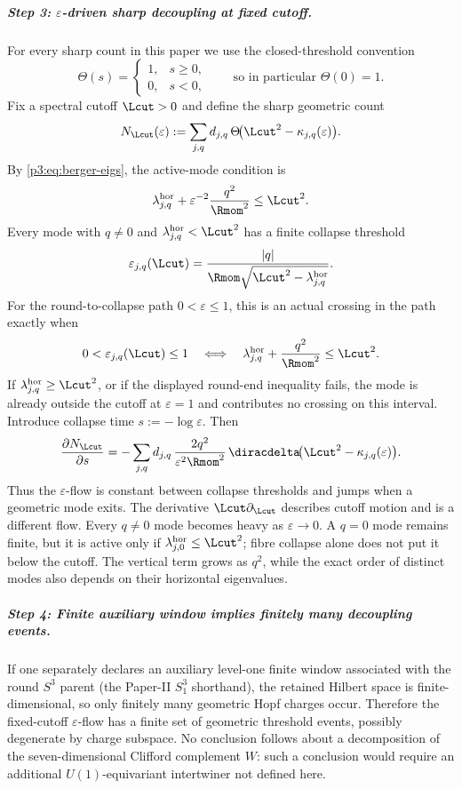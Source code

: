 \documentclass[11pt,a4paper]{article}
\begin{document}
\subparagraph{\texorpdfstring{Step 3: \(\varepsilon\)-driven sharp decoupling at fixed cutoff.}{Step 3: epsilon-driven sharp decoupling at fixed cutoff.}}
For every sharp count in this paper we use the closed-threshold convention
\[
 \Theta(s)=
 \begin{cases}
  1,&s\ge0,\\
  0,&s<0,
 \end{cases}
 \qquad\text{so in particular }\Theta(0)=1.
\]
Fix a spectral cutoff \(\Lcut>0\) and define the sharp geometric count
\[
 N_{\Lcut}(\varepsilon)
 :=\sum_{j,q}d_{j,q}\,
 \Theta\!\bigl(\Lcut^2-\kappa_{j,q}(\varepsilon)\bigr).
\]
By \eqref{p3:eq:berger-eigs}, the active-mode condition is
\[
\lambda^{\mathrm{hor}}_{j,q} + \varepsilon^{-2}\frac{q^2}{\Rmom^2} \le \Lcut^2.
\]
Every mode with \(q\ne0\) and
\(\lambda^{\rm hor}_{j,q}<\Lcut^2\) has a finite collapse threshold
\[
 \varepsilon_{j,q}(\Lcut)
 =\frac{|q|}
 {\Rmom\sqrt{\Lcut^2-\lambda^{\rm hor}_{j,q}}}.
\]
For the round-to-collapse path \(0<\varepsilon\le1\), this is an actual
crossing in the path exactly when
\[
 0<\varepsilon_{j,q}(\Lcut)\le1
 \quad\Longleftrightarrow\quad
 \lambda^{\rm hor}_{j,q}+\frac{q^2}{\Rmom^2}
 \le\Lcut^2 .
\]
If \(\lambda^{\rm hor}_{j,q}\ge\Lcut^2\), or if the displayed round-end
inequality fails, the mode is already outside the cutoff at
\(\varepsilon=1\) and contributes no crossing on this interval.
Introduce collapse time \(s:=-\log\varepsilon\).  Then
\[
\frac{\partial N_{\Lcut}}{\partial s}
=-\sum_{j,q}d_{j,q}\,
 \frac{2q^2}{\varepsilon^2\Rmom^2}\,
 \diracdelta\!\bigl(\Lcut^2-\kappa_{j,q}(\varepsilon)\bigr).
\]
Thus the \(\varepsilon\)-flow is constant between collapse thresholds and
jumps when a geometric mode exits.  The derivative
\(\Lcut\partial_{\Lcut}\) describes cutoff motion and is a different flow.
Every \(q\ne0\) mode becomes heavy as \(\varepsilon\to0\).  A \(q=0\) mode
remains finite, but it is active only if
\(\lambda^{\rm hor}_{j,0}\le\Lcut^2\); fibre collapse alone does not put it
below the cutoff.  The vertical term grows as \(q^2\), while the exact order
of distinct modes also depends on their horizontal eigenvalues.

\subparagraph{Step 4: Finite auxiliary window implies finitely many decoupling events.}
If one separately declares an auxiliary level-one finite window associated with
the round \(S^3\) parent (the Paper-II \(S^3_1\) shorthand), the retained
Hilbert space is finite-dimensional, so only finitely many geometric Hopf
charges occur.  Therefore the fixed-cutoff
\(\varepsilon\)-flow has a finite set of geometric threshold events, possibly
degenerate by charge subspace.  No conclusion follows about a decomposition
of the seven-dimensional Clifford complement \(W\): such a conclusion would
require an additional \(U(1)\)-equivariant intertwiner not defined here.
\end{document}
